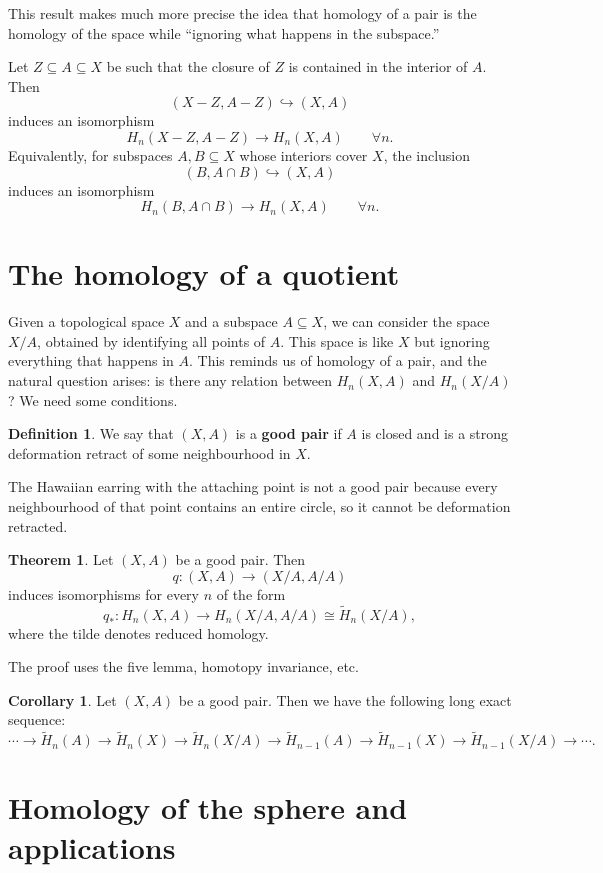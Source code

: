 \documentclass{book}
\theoremstyle{definition}
\newtheorem*{defn}{Definition}
\newtheorem*{teo}{Theorem}
\newtheorem*{coro}{Corollary}
\begin{document}
This result makes much more precise the idea that homology of
a pair is the homology of the space while ``ignoring what
happens in the subspace.''

Let $Z\subseteq A\subseteq X$ be such that the closure of $Z$
is contained in the interior of $A$. Then
$$
(X-Z,A-Z)\hookrightarrow (X,A)
$$
induces an isomorphism
$$
H_n(X-Z,A-Z)\to H_n(X,A)
\qquad\forall n.
$$
Equivalently, for subspaces $A,B\subseteq X$ whose interiors
cover $X$, the inclusion
$$
(B,A\cap B)\hookrightarrow (X,A)
$$
induces an isomorphism
$$
H_n(B,A\cap B)\to H_n(X,A)
\qquad\forall n.
$$

\section{The homology of a quotient}

Given a topological space $X$ and a subspace $A\subseteq X$,
we can consider the space $X/A$, obtained by identifying all
points of $A$. This space is like $X$ but ignoring everything
that happens in $A$. This reminds us of homology of a pair,
and the natural question arises: is there any relation
between $H_n(X,A)$ and $H_n(X/A)$? We need some conditions.

\begin{defn}
We say that $(X,A)$ is a \textbf{good pair} if $A$ is closed
and is a strong deformation retract of some neighbourhood in
$X$.
\end{defn}

The Hawaiian earring with the attaching point is not a good
pair because every neighbourhood of that point contains an
entire circle, so it cannot be deformation retracted.

\begin{teo}
Let $(X,A)$ be a good pair. Then
$$
q:(X,A)\to(X/A,A/A)
$$
induces isomorphisms for every $n$ of the form
$$
q_*:H_n(X,A)\to H_n(X/A,A/A)
\cong\tilde H_n(X/A),
$$
where the tilde denotes reduced homology.
\end{teo}

The proof uses the five lemma, homotopy invariance, etc.

\begin{coro}
Let $(X,A)$ be a good pair. Then we have the following long
exact sequence:
$$
\cdots\to\tilde H_n(A)\to\tilde H_n(X)\to\tilde H_n(X/A)
\to\tilde H_{n-1}(A)\to\tilde H_{n-1}(X)
\to\tilde H_{n-1}(X/A)\to\cdots.
$$
\end{coro}

\section{Homology of the sphere and applications}
\end{document}
